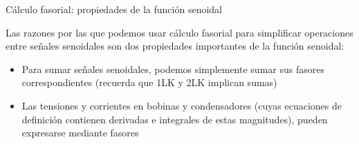 \documentclass[aspectratio=169, usenames,svgnames,dvipsnames]{beamer}
\begin{document}
\begin{frame}{Cálculo fasorial: \hspace{3mm}propiedades de la función senoidal} 

    \vspace{3mm}
    Las razones por las que podemos usar cálculo fasorial para \alert{simplificar operaciones entre señales senoidales} son dos propiedades importantes de la función senoidal:

    \begin{itemize}       
        \item {} 

        \vspace*{3mm}
        Para sumar señales senoidales, podemos simplemente \alert{sumar sus fasores correspondientes} (recuerda que 1LK y 2LK implican sumas)
        \vspace*{5mm}

        \item {} 

        \vspace*{3mm}
        Las \alert{tensiones y corrientes en bobinas y condensadores} (cuyas ecuaciones de definición contienen derivadas e integrales de estas magnitudes), \alert{pueden expresarse mediante fasores}       
    \end{itemize}  
\end{frame}
\end{document}

